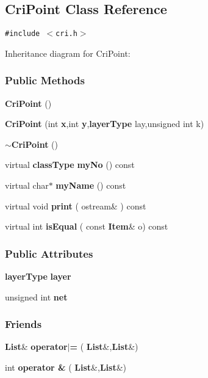 \subsection{Cri\-Point  Class Reference}
\label{CriPoint}
{\tt \#include $<$cri.h$>$}

Inheritance diagram for Cri\-Point:\begin{figure}[H]
\begin{center}
\leavevmode
\setlength{\epsfysize}{4cm}
\end{center}
\end{figure}
\subsubsection*{Public Methods}
\begin{CompactItemize}
\item 
{\bf Cri\-Point} ()
\item 
{\bf Cri\-Point} (int {\bf x},int {\bf y},{\bf layer\-Type} lay,unsigned int k)
\item 
{\bf $\sim$Cri\-Point} ()
\item 
virtual {\bf class\-Type} {\bf my\-No} () const
\item 
virtual char$\ast$ {\bf my\-Name} () const
\item 
virtual void {\bf print} ( ostream\& ) const
\item 
virtual int {\bf is\-Equal} ( const {\bf Item}\& o) const
\end{CompactItemize}
\subsubsection*{Public Attributes}
\begin{CompactItemize}
\item 
{\bf layer\-Type} {\bf layer}
\item 
unsigned int {\bf net}
\end{CompactItemize}
\subsubsection*{Friends}
\begin{CompactItemize}
\item 
{\bf List}\& {\bf operator$|$=} ( {\bf List}\&,{\bf List}\&)
\item 
int {\bf operator \&} ( {\bf List}\&,{\bf List}\&)
\end{CompactItemize}


